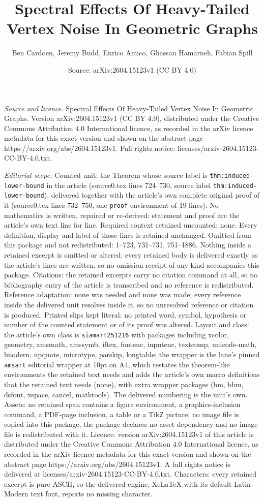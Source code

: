 \documentclass[10pt,a4paper]{amsart}
\title[Spectral Effects Of Heavy-Tailed Vertex Noise In Geometric G]{Spectral Effects Of Heavy-Tailed Vertex Noise In Geometric Graphs}
\author{Ben Cardoen, Jeremy Budd, Enrico Amico, Ghassan Hamarneh, Fabian Spill}
\date{Source: arXiv:2604.15123v1 (CC BY 4.0)}
\begin{document}
\maketitle

\noindent\emph{Source and licence.} Spectral Effects Of Heavy-Tailed Vertex Noise In Geometric Graphs. Version arXiv:2604.15123v1 (CC BY 4.0), distributed under the Creative Commons Attribution 4.0 International licence, as recorded in the arXiv licence metadata for this exact version and shown on the abstract page https://arxiv.org/abs/2604.15123v1. Full rights notice: licenses/arxiv-2604.15123-CC-BY-4.0.txt.\par\smallskip

\noindent\textit{Editorial scope.} Counted unit: the Theorem whose source label is \texttt{thm:induced-lower-bound} in the article (source0.tex lines 724--730, source label \texttt{thm:induced-lower-bound}), delivered together with the article's own complete original proof of it (source0.tex lines 732--750, one \texttt{proof} environment of 19 lines). No mathematics is written, repaired or re-derived: statement and proof are the article's own text line for line. Required context retained uncounted: none. Every definition, display and label of those lines is retained unchanged. Omitted from this package and not redistributed: 1--723, 731--731, 751--1886. Nothing inside a retained excerpt is omitted or altered: every retained body is delivered exactly as the article's lines are written, so no omission receipt of any kind accompanies this package. Citations: the retained excerpts carry no citation command at all, so no bibliography entry of the article is transcribed and no reference is redistributed. Reference adaptation: none was needed and none was made; every reference inside the delivered unit resolves inside it, so no unresolved reference or citation is produced. Printed slips kept literal: no printed word, symbol, hypothesis or number of the counted statement or of its proof was altered. Layout and class: the article's own class is \texttt{siamart251216} with packages including xcolor, geometry, amsmath, amssymb, iftex, fontenc, inputenc, textcomp, unicode-math, lmodern, upquote, microtype, parskip, longtable; the wrapper is the lane's pinned \texttt{amsart} editorial wrapper at 10pt on A4, which restates the theorem-like environments the retained text needs and adds the article's own macro definitions that the retained text needs (none), with extra wrapper packages (bm, bbm, dsfont, xspace, cancel, mathtools). The delivered numbering is the unit's own. Assets: no retained span contains a figure environment, a graphics-inclusion command, a PDF-page inclusion, a table or a TikZ picture; no image file is copied into this package, the package declares no asset dependency and no image file is redistributed with it. Licence: version arXiv:2604.15123v1 of this article is distributed under the Creative Commons Attribution 4.0 International licence, as recorded in the arXiv licence metadata for this exact version and shown on the abstract page https://arxiv.org/abs/2604.15123v1. A full rights notice is delivered at licenses/arxiv-2604.15123-CC-BY-4.0.txt. Characters: every retained excerpt is pure ASCII, so the delivered engine, XeLaTeX with its default Latin Modern text font, reports no missing character.
\end{document}
